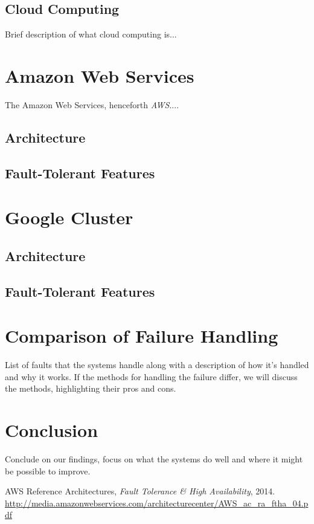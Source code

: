 \documentclass[11pt]{report}
\begin{document}
\section{Cloud Computing}
Brief description of what cloud computing is...

\chapter{Amazon Web Services}
The Amazon Web Services, henceforth \emph{AWS}....

\section{Architecture}
\section{Fault-Tolerant Features}

\chapter{Google Cluster}
\section{Architecture}
\section{Fault-Tolerant Features}

\chapter{Comparison of Failure Handling}
List of faults that the systems handle along with a description of how it's handled and why it works. If the methods for handling the failure differ, we will discuss the methods, highlighting their pros and cons.

\chapter{Conclusion}
Conclude on our findings, focus on what the systems do well and where it might be possible to improve.

\begin{thebibliography}{99}

	AWS Reference Architectures, \emph{Fault Tolerance \& High Availability}, 2014.
	\url{http://media.amazonwebservices.com/architecturecenter/AWS_ac_ra_ftha_04.pdf}

\end{thebibliography}
\end{document}
